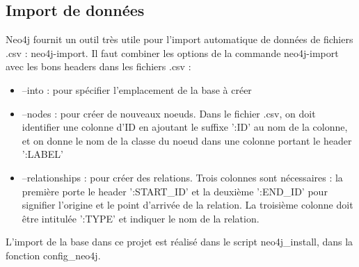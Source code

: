\subsection{Import de données}

Neo4j fournit un outil très utile pour l'import automatique de données de fichiers .csv : neo4j-import. Il faut combiner les options de la commande neo4j-import avec les bons headers dans les fichiers .csv :

\begin{itemize}
      \item --into : pour spécifier l'emplacement de la base à créer
      \item --nodes : pour créer de nouveaux noeuds. Dans le fichier .csv, on doit identifier une colonne d'ID en ajoutant le suffixe ':ID' au nom de la colonne, et on donne le nom de la classe du noeud dans une colonne portant le header ':LABEL'
      \item --relationships : pour créer des relations. Trois colonnes sont nécessaires : la première porte le header ':START\_ID' et la deuxième ':END\_ID' pour signifier l'origine et le point d'arrivée de la relation. La troisième colonne doit être intitulée ':TYPE' et indiquer le nom de la relation.
\end{itemize}

L'import de la base dans ce projet est réalisé dans le script neo4j\_install, dans la fonction config\_neo4j.
